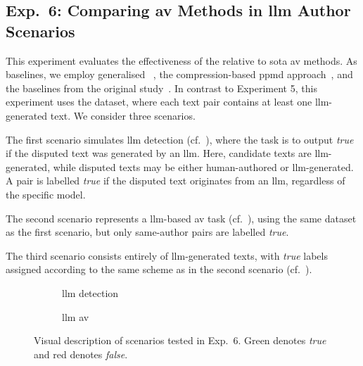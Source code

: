 \subsection{Exp.\ 6: Comparing \acs{av} Methods in \acs{llm} Author Scenarios}

This experiment evaluates the effectiveness of the \impAppr{} relative to \acl{sota} \ac{av} methods. 
As baselines, we employ generalised \unmasking{}~\citep{bevendorff_generalizing_2019}, the compression-based \ac{ppmd} approach~\citep{stamatatos_survey_2009}, and the baselines from the original \impAppr{} study~\citep{koppel_determining_2014}. 
In contrast to Experiment 5, this experiment uses the \dataArtificialStudent{} dataset, where each text pair contains at least one \ac{llm}-generated text. 
We consider three scenarios. 

The first scenario simulates \ac{llm} detection (cf.~), where the task is to output \textit{true} if the disputed text was generated by an \ac{llm}. 
Here, candidate texts are \ac{llm}-generated, while disputed texts may be either human-authored or \ac{llm}-generated. 
A pair is labelled \textit{true} if the disputed text originates from an \ac{llm}, regardless of the specific model. 

The second scenario represents a \ac{llm}-based \ac{av} task (cf.~), using the same dataset as the first scenario, but only same-author pairs are labelled \textit{true}. 

The third scenario consists entirely of \ac{llm}-generated texts, with \textit{true} labels assigned according to the same scheme as in the second scenario (cf.~). 

\begin{figure}[htbp]
  \centering
  \begin{subfigure}{0.45\textwidth}
    \centering
    
    \caption{\ac{llm} detection}
    \label{fig:idea_llm_detection}
  \end{subfigure}
  \hfill
  \begin{subfigure}{0.45\textwidth}
    \centering
    
    \caption{\ac{llm} \ac{av}}
    \label{fig:idea_llm_AV}
  \end{subfigure}
  \caption[Scenarios tested in Exp.\ 6.]{Visual description of scenarios tested in Exp.\ 6.
  Green denotes \textit{true} and red denotes \textit{false}.
  }
  \label{fig:ideas_exp6}
\end{figure}

